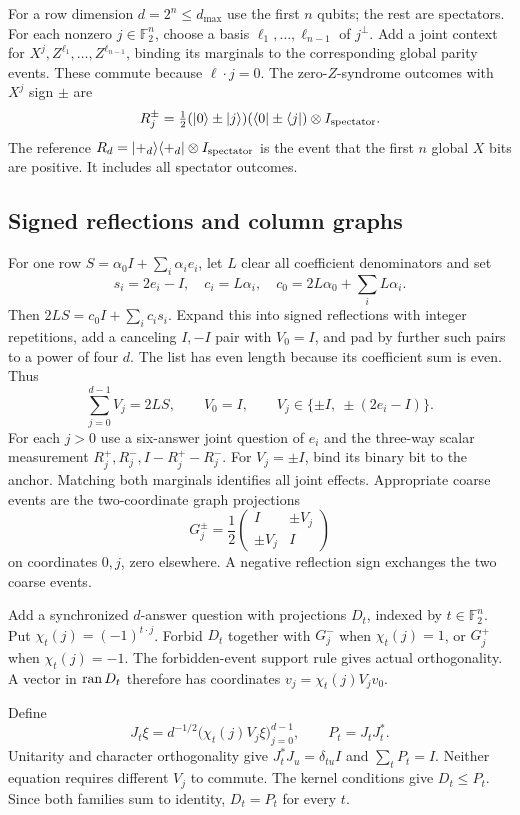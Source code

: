 For a row dimension $d=2^n\leq d_{\max}$ use the first $n$ qubits; the rest are spectators. For each nonzero $j\in\mathbb F_2^n$, choose a basis $\ell_1,\ldots,\ell_{n-1}$ of $j^\perp$. Add a joint context for $X^j,Z^{\ell_1},\ldots,Z^{\ell_{n-1}}$, binding its marginals to the corresponding global parity events. These commute because $\ell\cdot j=0$. The zero-$Z$-syndrome outcomes with $X^j$ sign $\pm$ are
\[
 R_j^\pm=\tfrac12(|0\rangle\pm|j\rangle)(\langle0|\pm\langle j|)
                       \otimes I_{\rm spectator}.
\]
The reference $R_d=|+_d\rangle\langle+_d|\otimes I_{\rm spectator}$ is the event that the first $n$ global $X$ bits are positive. It includes all spectator outcomes.

\subsection{Signed reflections and column graphs}
For one row $S=\alpha_0I+\sum_i\alpha_ie_i$, let $L$ clear all coefficient denominators and set
\[
 s_i=2e_i-I,\quad c_i=L\alpha_i,\quad
 c_0=2L\alpha_0+\sum_iL\alpha_i.
\]
Then $2LS=c_0I+\sum_ic_is_i$. Expand this into signed reflections with integer repetitions, add a canceling $I,-I$ pair with $V_0=I$, and pad by further such pairs to a power of four $d$. The list has even length because its coefficient sum is even. Thus
\begin{equation}\label{eq:slots}
 \sum_{j=0}^{d-1}V_j=2LS,\qquad V_0=I,\qquad
 V_j\in\{\pm I,\ \pm(2e_i-I)\}.
\end{equation}
For each $j>0$ use a six-answer joint question of $e_i$ and the three-way scalar measurement $R_j^+,R_j^-,I-R_j^+-R_j^-$. For $V_j=\pm I$, bind its binary bit to the anchor. Matching both marginals identifies all joint effects. Appropriate coarse events are the two-coordinate graph projections
\[
 G_j^\pm=\frac12\begin{pmatrix}I&\pm V_j\\\pm V_j&I\end{pmatrix}
\]
on coordinates $0,j$, zero elsewhere. A negative reflection sign exchanges the two coarse events.

Add a synchronized $d$-answer question with projections $D_t$, indexed by $t\in\mathbb F_2^n$. Put $\chi_t(j)=(-1)^{t\cdot j}$. Forbid $D_t$ together with $G_j^-$ when $\chi_t(j)=1$, or $G_j^+$ when $\chi_t(j)=-1$. The forbidden-event support rule gives actual orthogonality. A vector in $\operatorname{ran} D_t$ therefore has coordinates $v_j=\chi_t(j)V_jv_0$.

Define
\[
 J_t\xi=d^{-1/2}\bigl(\chi_t(j)V_j\xi\bigr)_{j=0}^{d-1},
 \qquad P_t=J_tJ_t^*.
\]
Unitarity and character orthogonality give $J_t^*J_u=\delta_{tu}I$ and $\sum_tP_t=I$. Neither equation requires different $V_j$ to commute. The kernel conditions give $D_t\leq P_t$. Since both families sum to identity, $D_t=P_t$ for every $t$.

